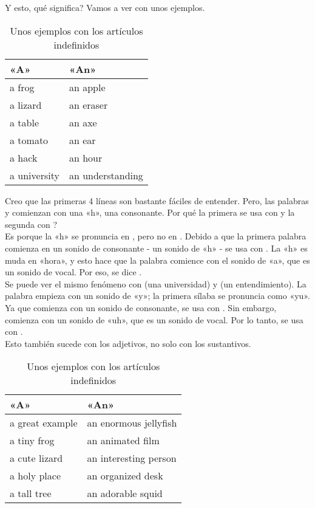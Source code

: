 Y esto, \textquestiondown qu\'e significa? Vamos a ver con unos ejemplos.

\begin{table}[H]
	\centering
	\begin{tabular}{ll}
	\toprule
	\textbf{«A»} & \textbf{«An»} \\
	\midrule
	a frog & an apple \\
	a lizard & an eraser \\
	a table & an axe \\
	a tomato & an ear \\
	a hack & an hour \\
	a university & an understanding \\
	\bottomrule
	\end{tabular}
	\caption{Unos ejemplos con los art\'iculos indefinidos}
\end{table}

Creo que las primeras 4 l\'ineas son bastante f\'aciles de entender.
Pero, las palabras  y  comienzan con una «h», una
consonante. \textquestiondown Por qu\'e la primera se usa con 
y la segunda con ? \\

Es porque la «h» se pronuncia en , pero no en .
Debido a que la primera palabra comienza en un sonido de consonante - un
sonido de «h» - se usa con . La «h» es muda en «hora», y esto
hace que la palabra comience con el sonido de «a», que es un sonido de vocal.
Por eso, se dice .\\

Se puede ver el mismo fen\'omeno con  (una universidad) y
 (un entendimiento). La palabra  empieza
con un sonido de «y»; la primera s\'ilaba se pronuncia como «yu». Ya que
comienza con un sonido de consonante, se usa con . Sin embargo,
 comienza con un sonido de «uh», que es un sonido de vocal.
Por lo tanto, se usa con .\\

Esto tambi\'en sucede con los adjetivos, no solo con los sustantivos.

\begin{table}[H]
	\centering
	\begin{tabular}{ll}
	\toprule
	\textbf{«A»} & \textbf{«An»} \\
	\midrule
	a great example & an enormous jellyfish \\
	a tiny frog & an animated film \\
	a cute lizard & an interesting person \\
	a holy place & an organized desk\\
	a tall tree & an adorable squid \\
	\bottomrule
	\end{tabular}
	\caption{Unos ejemplos con los art\'iculos indefinidos}
\end{table}

